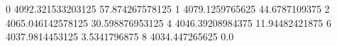 0 4092.321533203125 57.874267578125
1 4079.1259765625 44.6787109375
2 4065.046142578125 30.598876953125
4 4046.39208984375 11.94482421875
6 4037.9814453125 3.5341796875
8 4034.447265625 0.0
